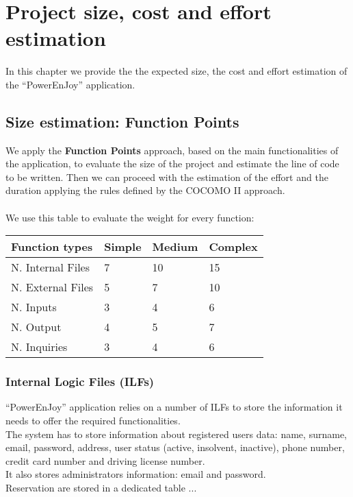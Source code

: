 \pagebreak
\section{Project size, cost and effort estimation}

In this chapter we provide the the expected size, the cost and effort estimation of the ``PowerEnJoy'' application.

\subsection{Size estimation: Function Points}

We apply the \textbf{Function Points} approach, based on the main functionalities of the application, to evaluate the size of the project and estimate the line of code to be written. Then  we can proceed with the estimation of the effort and the duration applying the rules defined by the COCOMO II approach. \\
\\
We use this table to evaluate the weight for every function: \\

\begin{tabular}{|l|l|l|l|}
	\hline
	\textbf{Function types} 	& \textbf{Simple} 	& \textbf{Medium} 	& \textbf{Complex} \\
	\hline \hline
	N. Internal Files 	& 7 	& 10 	& 15 \\
	\hline
	N. External Files 	& 5 	& 7 	& 10 \\
	\hline
	N. Inputs 	& 3 	& 4 	& 6 \\
	\hline
	N. Output 	& 4 	& 5 	& 7 \\
	\hline
	N. Inquiries 	& 3 	& 4 	& 6 \\	
	\hline
\end{tabular}

\subsubsection{Internal Logic Files (ILFs)}
``PowerEnJoy'' application relies on a number of ILFs to store the information it needs to offer the required functionalities. \\
The system has to store information about registered users data: name, surname, email, password, address, user status (active, insolvent, inactive), phone number, credit card number and driving license number. \\
It also stores administrators information: email and password. \\
Reservation are stored in a dedicated table ... 

